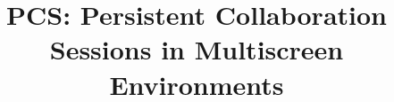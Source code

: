 \documentclass{sig-alternate}
\begin{document}
%

\title{PCS: Persistent Collaboration Sessions in Multiscreen Environments}

%
%
%
%
%
\end{document}
